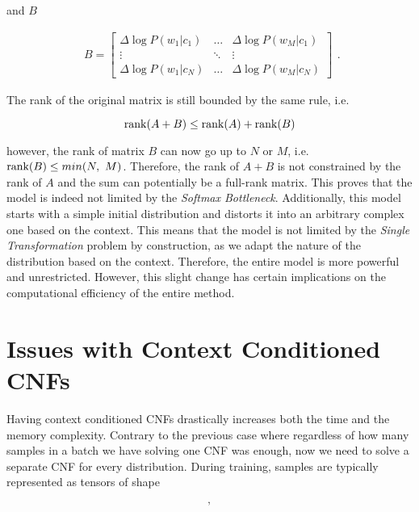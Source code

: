 and $ B $

\begin{displaymath}
    \begin{matrix}
    B = \begin{bmatrix}
       \Delta \log P(w_1 | c_1) & \hdots & \Delta \log P(w_M | c_1) \\
       \vdots & \ddots & \vdots \\
       \Delta \log P(w_1 | c_N) & \hdots & \Delta \log P(w_M | c_N)
      \end{bmatrix}
    \end{matrix}.
\end{displaymath}

The rank of the original matrix is still bounded by the same rule, i.e.

\begin{displaymath}
    \operatorname{rank}(A + B) \leq \operatorname{rank}(A) + \operatorname{rank}(B)
\end{displaymath}

however, the rank of matrix $ B $ can now go up to $ N $ or $ M $, i.e. $ \operatorname{rank}(B) \leq min(N, \ M) $. Therefore, the rank of $ A + B $ is not constrained by the rank of $ A $ and the sum can potentially be a full-rank matrix. This proves that the model is indeed not limited by the \emph{Softmax Bottleneck}. Additionally, this model starts with a simple initial distribution and distorts it into an arbitrary complex one based on the context. This means that the model is not limited by the \emph{Single Transformation} problem by construction, as we adapt the nature of the distribution based on the context. Therefore, the entire model is more powerful and unrestricted. However, this slight change has certain implications on the computational efficiency of the entire method.

\section{Issues with Context Conditioned CNFs}
\label{section:cnf_lm:issues_cc_cnfs}

Having context conditioned CNFs drastically increases both the time and the memory complexity. Contrary to the previous case where regardless of how many samples in a batch we have solving one CNF was enough, now we need to solve a separate CNF for every distribution. During training, samples are typically represented as tensors of shape

\begin{displaymath}
    [batch\_size, \ sequence\_size, \ embedding\_size],
\end{displaymath}

